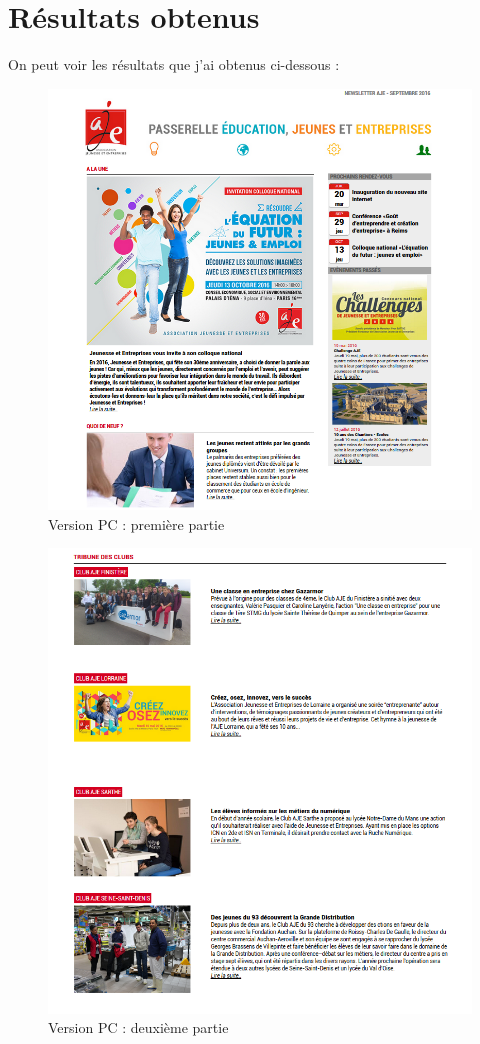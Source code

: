\documentclass[report]{tnreport}
\begin{document}
\section{Résultats obtenus}

On peut voir les résultats que j’ai obtenus ci-dessous : 

\begin{figure}[h]
  \centering
  \includegraphics[width=13cm]{figures/aje1}
  \caption{Version PC : première partie}
  \label{fig:aje1}
\end{figure}

\begin{figure}[h]
  \centering
  \includegraphics[width=13cm]{figures/aje2}
  \caption{Version PC : deuxième partie}
  \label{fig:aje2}
\end{figure}
\end{document}
